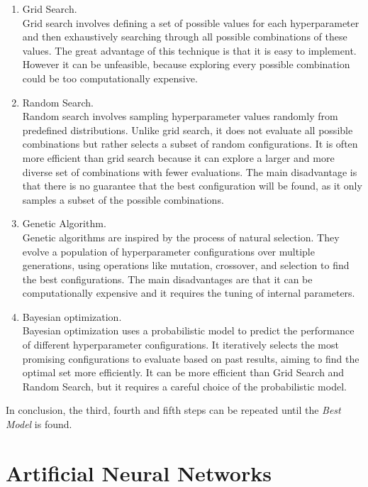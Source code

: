\begin{enumerate}
    \item Grid Search.\\
    Grid search involves defining a set of possible values for each hyperparameter and then exhaustively searching through all 
    possible combinations of these values.
    The great advantage of this technique is that it is easy to implement.
    However it can be unfeasible, because exploring every possible combination could be too computationally expensive.

    \item Random Search.\\
    Random search involves sampling hyperparameter values randomly from predefined distributions. Unlike grid search, 
    it does not evaluate all possible combinations but rather selects a subset of random configurations.
    It is often more efficient than grid search because it can explore a larger and more diverse set of combinations with fewer evaluations.
    The main disadvantage is that there is no guarantee that the best configuration will be found, as it only samples a subset of the 
    possible combinations.

    \item Genetic Algorithm.\\
    Genetic algorithms are inspired by the process of natural selection. They evolve a population of hyperparameter configurations 
    over multiple generations, using operations like mutation, crossover, and selection to find the best configurations.
    The main disadvantages are that it can be computationally expensive and it requires the tuning of internal parameters.

    \item Bayesian optimization.\\
    Bayesian optimization uses a probabilistic model to predict the performance of different hyperparameter configurations. 
    It iteratively selects the most promising configurations to evaluate based on past results, aiming to find the optimal set more efficiently.
    It can be more efficient than Grid Search and Random Search, but it requires a careful choice of the probabilistic model.

\end{enumerate}

In conclusion, the third, fourth and fifth steps can be repeated until the \textit{Best Model} is found.


\section{Artificial Neural Networks}

